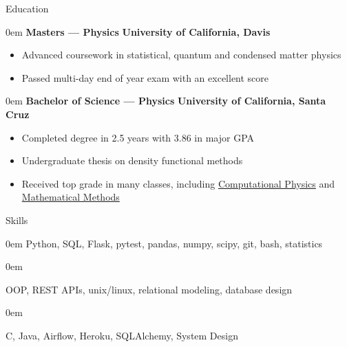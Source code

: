 \documentclass[11pt,a4paper]{article}
\newenvironment{headedsection}[2]{
    \begin{addmargin}[0.5em]{0em}
    {\large\bfseries #1} \hfill {\bfseries #2}%
    \begin{itemize}
        [label={}, topsep=0pt, itemsep=1.5pt, parsep=0pt, leftmargin=1.5em]
}{
    \end{itemize}
    \end{addmargin}
    \medskip
}
\begin{document}
\begin{mysection}{Education}
    \begin{headedsection}{Masters --- Physics}
          {University of California, Davis}

        \item Advanced coursework in statistical, quantum and condensed matter
            physics
        \item Passed multi-day end of year exam with an excellent score
    \end{headedsection}

    \begin{headedsection}{Bachelor of Science --- Physics}
          {University of California, Santa Cruz}

        \item Completed degree in 2.5 years with 3.86 in major GPA
        \item Undergraduate thesis on density functional methods
        \item Received top grade in many classes, including 
            \href{http://young.physics.ucsc.edu/115/}{Computational Physics}
            and
            \href{http://scipp.ucsc.edu/~haber/ph116C/}{Mathematical Methods}
    \end{headedsection}
\end{mysection}

\begin{mysection}{Skills}

    \begin{addmargin}[0.5em]{0em}
        \phantom{\large\bfseries Software Fundamentals: \quad}
        Python, SQL, Flask, pytest, pandas, numpy, scipy, git, bash, statistics

    \end{addmargin}

    \begin{addmargin}[0.5em]{0em}

    \phantom{\large\bfseries Software Fundamentals: \quad}
     OOP, REST APIs, unix/linux, relational modeling, database design
    \end{addmargin}

    \begin{addmargin}[0.5em]{0em}

    \phantom{\large\bfseries Software Fundamentals: \quad}
    C, Java, Airflow, Heroku, SQLAlchemy, System Design
    \end{addmargin}

\end{mysection}
\end{document}
